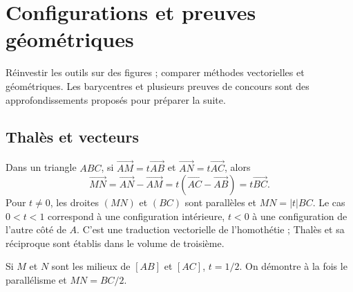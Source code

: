 \documentclass[../cours_2de.tex]{subfiles}
\begin{document}
\setcounter{chapter}{10}
\chapter{Configurations et preuves géométriques}
\label{sec:ch11}
\begin{objectif}
Réinvestir les outils sur des figures ; comparer méthodes vectorielles et géométriques. Les barycentres et plusieurs preuves de concours sont des approfondissements proposés pour préparer la suite.
\end{objectif}
\section{Thalès et vecteurs}
Dans un triangle $ABC$, si
$\overrightarrow{AM}=t\overrightarrow{AB}$ et
$\overrightarrow{AN}=t\overrightarrow{AC}$, alors
\[
\overrightarrow{MN}=\overrightarrow{AN}-\overrightarrow{AM}
=t(\overrightarrow{AC}-\overrightarrow{AB})=t\overrightarrow{BC}.
\]
Pour $t\ne0$, les droites $(MN)$ et $(BC)$ sont parallèles et $MN=|t|BC$.
Le cas $0<t<1$ correspond à une configuration intérieure, $t<0$ à une configuration de l'autre côté de $A$.
C'est une traduction vectorielle de l'homothétie ; Thalès et sa réciproque sont établis dans le volume de troisième.
\begin{exemple}
Si $M$ et $N$ sont les milieux de $[AB]$ et $[AC]$, $t=1/2$.
On démontre à la fois le parallélisme et $MN=BC/2$.
\end{exemple}
\end{document}
